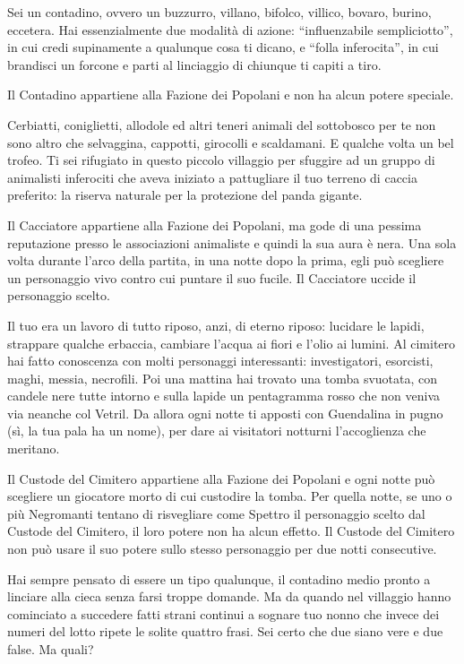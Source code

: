 {%
Sei un contadino, ovvero un buzzurro, villano, bifolco, villico, bovaro, burino, eccetera. Hai essenzialmente due modalità di azione: ``influenzabile sempliciotto'', in cui credi supinamente a qualunque cosa ti dicano, e ``folla inferocita'', in cui brandisci un forcone e parti al linciaggio di
chiunque ti capiti a tiro.

Il Contadino appartiene alla Fazione dei Popolani e non ha alcun potere speciale.
{%


{%
Cerbiatti, coniglietti, allodole ed altri teneri animali del sottobosco per te non sono altro che selvaggina, cappotti, girocolli e scaldamani. E qualche volta un bel trofeo. Ti sei rifugiato in questo piccolo villaggio per sfuggire ad un gruppo di animalisti inferociti che aveva iniziato a pattugliare il tuo terreno di caccia preferito: la riserva naturale per la protezione del panda gigante.

Il Cacciatore appartiene alla Fazione dei Popolani, ma gode di una pessima reputazione presso le associazioni animaliste e quindi la sua aura è nera. Una sola volta durante l'arco della partita, in una notte dopo la prima, egli può scegliere un personaggio vivo contro cui puntare il suo fucile. Il Cacciatore uccide il personaggio scelto.
{%


{%
Il tuo era un lavoro di tutto riposo, anzi, di eterno riposo: lucidare le lapidi, strappare qualche erbaccia, cambiare l'acqua ai fiori e l'olio ai lumini. Al cimitero hai fatto conoscenza con molti personaggi interessanti: investigatori, esorcisti, maghi, messia, necrofili. Poi una mattina hai trovato una tomba svuotata, con candele nere tutte intorno e sulla lapide un pentagramma rosso che non veniva via neanche col Vetril. Da allora ogni notte ti apposti con Guendalina in pugno (sì, la tua pala ha un nome), per dare ai visitatori notturni l'accoglienza che meritano.

Il Custode del Cimitero appartiene alla Fazione dei Popolani e ogni notte può scegliere un giocatore morto di cui custodire la tomba. Per quella notte, se uno o più Negromanti tentano di risvegliare come Spettro il personaggio scelto dal Custode del Cimitero, il loro potere non ha alcun effetto. Il Custode del Cimitero non può usare il suo potere sullo stesso personaggio per due notti consecutive.
{%


{%
Hai sempre pensato di essere un tipo qualunque, il contadino medio pronto a linciare alla cieca senza farsi troppe domande. Ma da quando nel villaggio hanno cominciato a succedere fatti strani continui a sognare tuo nonno che invece dei numeri del lotto ripete le solite quattro frasi. Sei certo che due siano vere e due false. Ma quali?

}}}}}}}
